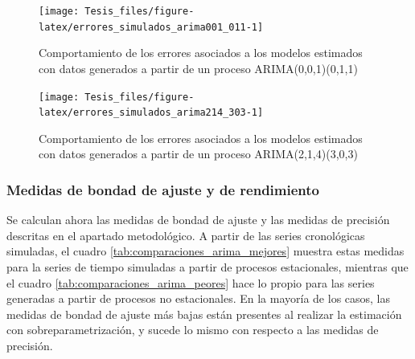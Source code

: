 \documentclass[
]{article}
\begin{document}
\begin{figure}[H]
\texttt{[image: Tesis\_files/figure-latex/errores\_simulados\_arima001\_011-1]} \caption{Comportamiento de los errores asociados a los modelos estimados con datos generados a partir de un proceso ARIMA(0,0,1)(0,1,1)}\label{fig:errores_simulados_arima001_011}
\end{figure}

\begin{figure}[H]
\texttt{[image: Tesis\_files/figure-latex/errores\_simulados\_arima214\_303-1]} \caption{Comportamiento de los errores asociados a los modelos estimados con datos generados a partir de un proceso ARIMA(2,1,4)(3,0,3)}\label{fig:errores_simulados_arima214_303}
\end{figure}

\subsubsection{Medidas de bondad de ajuste y de rendimiento}

Se calculan ahora las medidas de bondad de ajuste y las medidas de
precisión descritas en el apartado metodológico. A partir de las series
cronológicas simuladas, el cuadro \ref{tab:comparaciones_arima_mejores}
muestra estas medidas para la series de tiempo simuladas a partir de
procesos estacionales, mientras que el cuadro
\ref{tab:comparaciones_arima_peores} hace lo propio para las series
generadas a partir de procesos no estacionales. En la mayoría de los
casos, las medidas de bondad de ajuste más bajas están presentes al
realizar la estimación con sobreparametrización, y sucede lo mismo con
respecto a las medidas de precisión.
\end{document}
